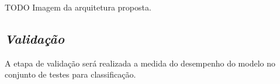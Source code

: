 TODO Imagem da arquitetura proposta.



\subsection{\textit{Validação}}\label{sec:Cap3_Validacao}

A etapa de validação será realizada a medida do desempenho do modelo no conjunto de testes para classificação.











